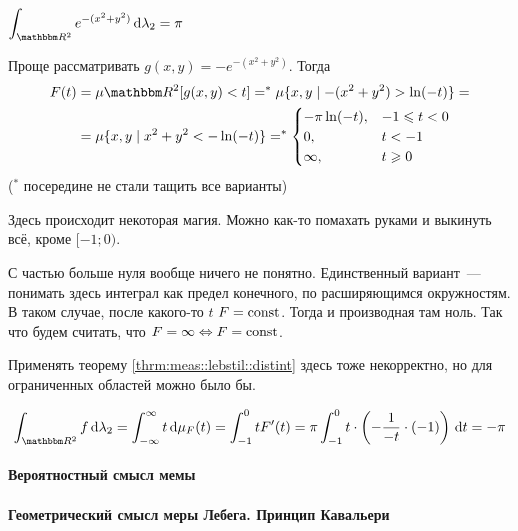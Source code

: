 \documentclass[draft, timbord]{longnotes}
\begin{document}
\begin{prop}\label{prop:meas::eulpuass}
  $\displaystyle \int_{\R^2} e^{-(x^2 + y^2)}\, \del \lambda_2 = \pi $ 
\end{prop}

\begin{lproof}
  Проще рассматривать $g(x,y) = -e^{ -(x^2 + y^2) }$. Тогда
  \[
    \begin{split}
      F(t) &= \mu \R^2 [g(x,y) < t] =^* \mu \{x,y \mid -(x^2 + y^2) > \ln(-t) \} =\\
           &= \mu \{ x,y \mid x^2 + y^2 < -\ln(-t) \} =^* 
        \begin{cases}
          -\pi \ln(-t), & -1 \leqslant t < 0 \\
          0,            & t < -1             \\
          \infty ,      & t \geqslant 0
        \end{cases}
      \end{split}  
  \]
  (${}^*$ посередине не стали тащить все варианты)

  Здесь происходит некоторая магия. Можно как-то помахать руками и выкинуть всё, кроме
  $[-1;0)$.
  
  С частью больше нуля вообще ничего не понятно. Единственный вариант~---
  понимать здесь интеграл как предел конечного, по расширяющимся окружностям. В таком случае,
  после какого-то $t$ $F= \rm const$. Тогда и производная там ноль. Так что будем считать, что
  $F = \infty \Leftrightarrow F = \rm const$.
  
  Применять теорему \ref{thrm:meas::lebstil::distint} 
  здесь тоже некорректно, но для ограниченных областей можно было бы.

  \[
    \int_{\R^2} f\, \del \lambda_2  = \int_{- \infty }^ \infty  t \, \del \mu_F (t)
    = \int_{-1}^0 t F'(t) 
    = \pi \int_{-1}^0 t  \cdot \left(- \frac 1 {-t} \cdot (-1) \right) \, \del t = -\pi 
  \]
\end{lproof}



\paragraph{Вероятностный смысл мемы}
\label{par:meas::prob}


\paragraph{Геометрический смысл меры Лебега. Принцип Кавальери}
\label{par:meas::geomleb}
\end{document}
